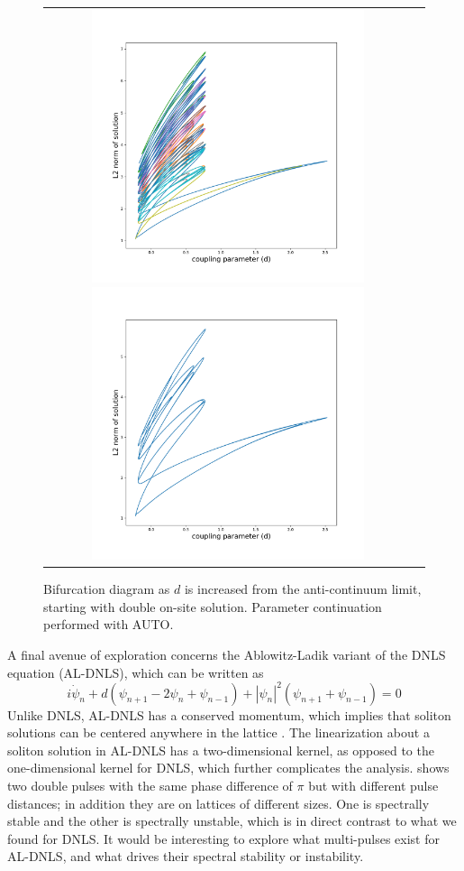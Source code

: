 \documentclass[thesis2.tex]{subfiles}
\begin{document}
\begin{figure}
\begin{center}
\begin{tabular}{cc}
\includegraphics[width=8cm]{images/dnls/bd2.pdf}
\includegraphics[width=8cm]{images/dnls/bd3.pdf}
\end{tabular}
\end{center}
\caption[Bifurcation diagram in DNLS for increasing $d$]{Bifurcation diagram as $d$ is increased from the anti-continuum limit, starting with double on-site solution. Parameter continuation performed with AUTO.}
\label{fig:DNLSbd2}
\end{figure}

A final avenue of exploration concerns the Ablowitz-Ladik variant of the DNLS equation (AL-DNLS), which can be written as
\begin{equation*}
i\dot{\psi}_n + d(\psi_{n+1} - 2 \psi_n + \psi_{n-1}) + |\psi_n|^2 (\psi_{n+1} + \psi_{n-1}) = 0
\end{equation*}
Unlike DNLS, AL-DNLS has a conserved momentum, which implies that soliton solutions can be centered anywhere in the lattice \cite{Kevrekidis2009}. The linearization about a soliton solution in AL-DNLS has a two-dimensional kernel, as opposed to the one-dimensional kernel for DNLS, which further complicates the analysis. \cite[Figure 5]{Kevrekidis2002} shows two double pulses with the same phase difference of $\pi$ but with different pulse distances; in addition they are on lattices of different sizes. One is spectrally stable and the other is spectrally unstable, which is in direct contrast to what we found for DNLS. It would be interesting to explore what multi-pulses exist for AL-DNLS, and what drives their spectral stability or instability.


\iffulldocument\else
	
	
\fi
\end{document}
